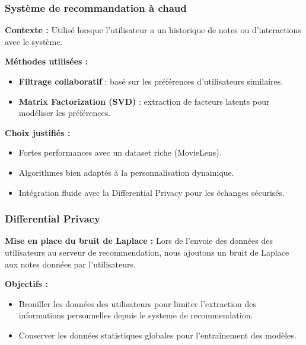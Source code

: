 \documentclass{beamer}
\begin{document}
\begin{frame}
    \scriptsize
    \frametitle{Système de recommandation à chaud}
    \textbf{Contexte :} Utilisé lorsque l’utilisateur a un historique de notes ou d’interactions avec le système.

    \vspace{0.3cm}
    \textbf{Méthodes utilisées :}
    \begin{itemize}
        \item \textbf{Filtrage collaboratif} : basé sur les préférences d’utilisateurs similaires.
        \item \textbf{Matrix Factorization (SVD)} : extraction de facteurs latents pour modéliser les préférences.
    \end{itemize}

    \vspace{0.3cm}
    \textbf{Choix justifiés :}
    \begin{itemize}
        \item Fortes performances avec un dataset riche (MovieLens).
        \item Algorithmes bien adaptés à la personnalisation dynamique.
        \item Intégration fluide avec la Differential Privacy pour les échanges sécurisés.
    \end{itemize}
\end{frame}

\begin{frame}
        \scriptsize
        \frametitle{Differential Privacy}
        \textbf{Mise en place du bruit de Laplace :}
        Lors de l'envoie des données des utilisateurs au serveur de recommendation, nous ajoutons un bruit de Laplace aux notes données par l'utilisateurs.
        
        \vspace{0.3cm}
        \textbf{Objectifs :}
        \begin{itemize}
            \item Brouiller les données des utilisateurs pour limiter l'extraction des informations personnelles depuis le systeme de recommendation.
            \item Conserver les données statistiques globales pour l'entraînement des modèles.
        \end{itemize}
    \end{frame}
\end{document}
